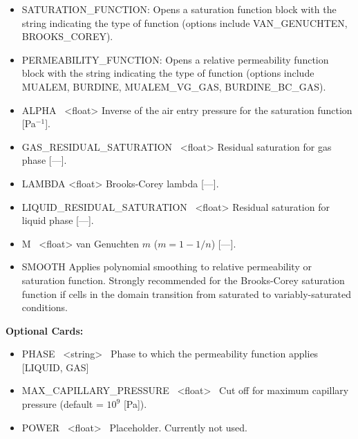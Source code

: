 \begin{itemize}

\item SATURATION\_FUNCTION:
Opens a saturation function block with the string indicating the type of function (options include VAN\_GENUCHTEN, BROOKS\_COREY).

\item PERMEABILITY\_FUNCTION:
Opens a relative permeability function block with the string indicating the type of function (options include MUALEM, BURDINE, MUALEM\_VG\_GAS, BURDINE\_BC\_GAS).

\item ALPHA \ <float>
Inverse of the air entry pressure for the saturation function [Pa$^{-1}$].

\item GAS\_RESIDUAL\_SATURATION \ <float>
Residual saturation for gas phase [---].

\item LAMBDA <float>
Brooks-Corey lambda [---].

\item LIQUID\_RESIDUAL\_SATURATION \ <float>
Residual saturation for liquid phase [---].

\item M \ <float>
van Genuchten $m$ ($m = 1\!-\!1/n$) [---].

\item SMOOTH
Applies polynomial smoothing to relative permeability or saturation function. Strongly recommended for the Brooks-Corey saturation function if cells in the domain transition from saturated to variably-saturated conditions.
\end{itemize}

{\noindent\bf Optional Cards:}

\begin{itemize}
\item PHASE \ <string> \ Phase to which the permeability function applies [LIQUID, GAS]
\item MAX\_CAPILLARY\_PRESSURE \ <float> \ Cut off for maximum capillary pressure (default = $10^9$ [Pa]).
\item POWER \ <float> \ Placeholder. Currently not used.
\end{itemize}

